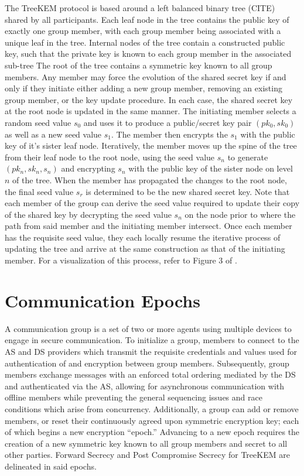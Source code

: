 The TreeKEM protocol is based around a left balanced binary tree (CITE) shared by all participants.
Each leaf node in the tree contains the public key of exactly one group member, with each group member being associated with a unique leaf in the tree.
Internal nodes of the tree contain a constructed public key, such that the private key is known to each group member in the associated sub-tree
The root of the tree contains a symmetric key known to all group members.
Any member may force the evolution of the shared secret key if and only if they initiate either adding a new group member, removing an existing group member, or the key update procedure.
In each case, the shared secret key at the root node is updated in the same manner.
The initiating member selects a random seed value \(s_0\) and uses it to produce a public/secret key pair \((pk_0,sk_0)\) as well as a new seed value \(s_1\).
The member then encrypts the \(s_1\) with the public key of it's sister leaf node.
Iteratively, the member moves up the spine of the tree from their leaf node to the root node, using the seed value \(s_n\) to generate \((pk_n,sk_n,s_n)\) and encrypting \(s_n\) with the public key of the sister node on level \(n\) of the tree.
When the member has propagated the changes to the root node, the final seed value \(s_r\) is determined to be the new shared secret key.
Note that each member of the group can derive the seed value required to update their copy of the shared key by decrypting the seed value \(s_n\) on the node prior to where the path from said member and the initiating member intersect.
Once each member has the requisite seed value, they each locally resume the iterative process of updating the tree and arrive at the same construction as that of the initiating member.
For a visualization of this process, refer to Figure 3 of \autocite{alwen2020security}.

\hypertarget{communication-epochs}{%
\section{Communication Epochs}\label{communication-epochs}}

A communication group is a set of two or more agents using multiple devices to engage in secure communication.
To initialize a group, members to connect to the AS and DS providers which transmit the requisite credentials and values used for authentication of and encryption between group members.
Subsequently, group members exchange messages with an enforced total ordering mediated by the DS and authenticated via the AS, allowing for asynchronous communication with offline members while preventing the general sequencing issues and race conditions which arise from concurrency.
Additionally, a group can add or remove members, or reset their continuously agreed upon symmetric encryption key; each of which begins a new encryption ``epoch.''
Advancing to a new epoch requires the creation of a new symmetric key known to all group members and secret to all other parties.
Forward Secrecy and Post Compromise Secrecy for TreeKEM are delineated in said epochs.

